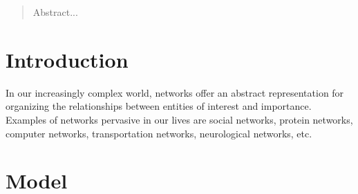 \documentclass{sig-alternate}
\begin{document}
{%
}

\maketitle

\begin{abstract}
Abstract...
\end{abstract}



\section{Introduction}


In our increasingly complex world, networks offer an abstract representation for organizing the relationships between entities of interest and importance. Examples of networks pervasive in our lives are social networks, protein networks, computer networks, transportation networks, neurological networks, etc.



\section{Model}
\end{document}
